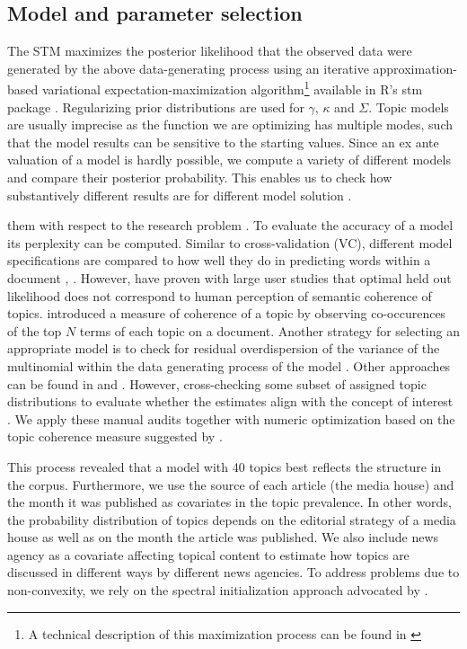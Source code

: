 \documentclass[12pt,a4paper,notitlepage]{article}
\begin{document}
\subsection{Model and parameter selection}

The STM maximizes the posterior likelihood that the observed data were generated by the above data-generating process using an iterative approximation-based variational expectation-maximization algorithm\footnote{A technical description of this maximization process can be found in \citet{roberts_model_2016}} available in R's stm package \citep{roberts_stm:_2016}. Regularizing prior distributions are used for $\gamma$, $\kappa$ and $\Sigma$. Topic models are usually imprecise as the function we are optimizing has multiple modes, such that the model results can be sensitive to the starting values. Since an ex ante valuation of a model is hardly possible, we compute a variety of different models and compare their posterior probability. This enables us to check how substantively different results are for different model solution \citep{roberts_navigating_2016}. 


them with respect to the research problem \citep{gentzkow_text_2017}. To evaluate the accuracy of a model its perplexity can be computed. Similar to cross-validation (VC), different model specifications are compared to how well they do in predicting words within a document \citep{asuncion_smoothing_2012}, \citep{wallach_evaluation_2009}. However, \citet{chang_reading_2009} have proven with large user studies that optimal held out likelihood does not correspond to human perception of semantic coherence of topics. \cite{mimno_optimizing_2011} introduced a measure of coherence of a topic by observing co-occurences of the top $N$ terms of each topic on a document. Another strategy for selecting an appropriate model is to check for residual overdispersion of the variance of the multinomial within the data generating process of the model \citep{taddy_estimation_2012}. Other approaches can be found in \citet{airoldi_reconceptualizing_2010} and \citet{teh_hierarchical_2006}. However, cross-checking some subset of assigned topic distributions to evaluate whether the estimates align with the concept of interest \citep{gentzkow_text_2017}. We apply these manual audits together with numeric optimization based on the topic coherence measure suggested by \citet{mimno_optimizing_2011}. 

This process revealed that a model with 40 topics best reflects the structure in the corpus. Furthermore, we use the source of each article (the media house) and the month it was published as covariates in the topic prevalence. In other words, the probability distribution of topics depends on the editorial strategy of a media house as well as on the month the article was published. We also include news agency as a covariate affecting topical content to estimate how topics are discussed in different ways by different news agencies. To address problems due to non-convexity, we rely on the spectral initialization approach advocated by \citet{roberts_navigating_2016}. 
\end{document}
